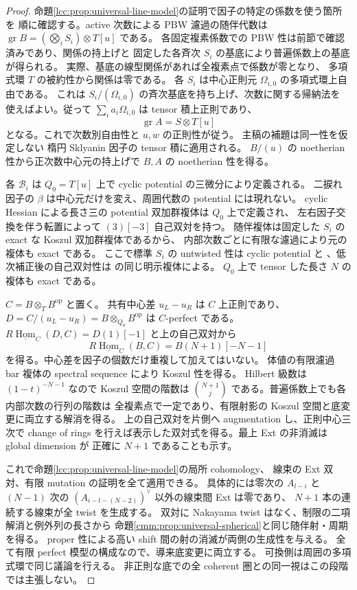 \begin{proof}
命題\ref{lcc:prop:universal-line-model}の証明で因子の特定の係数を使う箇所を
順に確認する。active 次数による PBW 濾過の随伴代数は
$\operatorname{gr}B=(\bigotimes_iS_i)\otimes T[u]$ である。
各固定複素係数での PBW 性は前節で確認済みであり、関係の持上げと
固定した各斉次 $S_i$ の基底により普遍係数上の基底が得られる。
実際、基底の線型関係があれば全複素点で係数が零となり、
多項式環 $T$ の被約性から関係は零である。
各 $S_i$ は中心正則元 $\Omega_{i,0}$ の多項式環上自由である。
これは $S_i/(\Omega_{i,0})$ の斉次基底を持ち上げ、次数に関する帰納法を
使えばよい。従って $\sum_i a_i\Omega_{i,0}$ は tensor 積上正則であり、
\[
 \operatorname{gr}A=S\otimes T[u]
\]
となる。これで次数別自由性と $u,w$ の正則性が従う。
主稿の補題は同一性を仮定しない
楕円 Sklyanin 因子の tensor 積に適用される。
$B/(u)$ の noetherian 性から正次数中心元の持上げで $B,A$ の noetherian 性を得る。

各 $\mathcal B_i$ は $Q_0=T[u]$ 上で cyclic potential の三微分により定義される。
二捩れ因子の $\beta$ は中心元だけを変え、周囲代数の potential には現れない。
cyclic Hessian による長さ三の potential 双加群複体は $Q_0$ 上で定義され、
左右因子交換を伴う転置によって $(3)[-3]$ 自己双対を持つ。
随伴複体は固定した $S_i$ の exact な Koszul 双加群複体であるから、
内部次数ごとに有限な濾過により元の複体も exact である。
ここで標準 $S_i$ の untwisted 性は cyclic potential と
\cite[Corollary~2.9]{MoriSmith}、低次補正後の自己双対性は
\cite[Theorem~3.6, Lemma~3.7 and proof]{NFMBeTa}の同じ明示複体による。
$Q_0$ 上で tensor した長さ $N$ の複体も exact である。

$C=B\otimes_TB^{\mathrm{op}}$ と置く。
共有中心差 $u_L-u_R$ は $C$ 上正則であり、
$D=C/(u_L-u_R)=B\otimes_{Q_0}B^{\mathrm{op}}$ は $C$-perfect である。
$R\underline{\operatorname{Hom}}_C(D,C)=D(1)[-1]$ と上の自己双対から
\[
 R\underline{\operatorname{Hom}}_C(B,C)=B(N+1)[-N-1]
\]
を得る。中心差を因子の個数だけ重複して加えてはいない。
体値の有限濾過 bar 複体の spectral sequence により Koszul 性を得る。
Hilbert 級数は $(1-t)^{-N-1}$ なので Koszul 空間の階数は
$\binom{N+1}{j}$ である。普遍係数上でも各内部次数の行列の階数は
全複素点で一定であり、有限射影の Koszul 空間と底変更に両立する解消を得る。
上の自己双対を片側へ augmentation し、正則中心三次で change of rings
を行えば表示した双対式を得る。最上 Ext の非消滅は global dimension が
正確に $N+1$ であることも示す。

これで命題\ref{lcc:prop:universal-line-model}の局所 cohomology、
線束の Ext 双対、有限 mutation の証明を全て適用できる。
具体的には零次の $A_{l-i}$ と $(N-1)$ 次の
$(A_{i-l-(N-2)})^\vee$ 以外の線束間 Ext は零であり、
$N+1$ 本の連続する線束が全 twist を生成する。
双対に Nakayama twist はなく、制限の二項解消と例外列の長さから
命題\ref{cmm:prop:universal-spherical}と同じ随伴射・周期を得る。
proper 性による高い shift 間の射の消滅が両側の生成性を与える。
全て有限 perfect 模型の構成なので、導来底変更に両立する。
可換側は周囲の多項式環で同じ議論を行える。
非正則な底での全 coherent 圏との同一視はこの段階では主張しない。
\end{proof}



